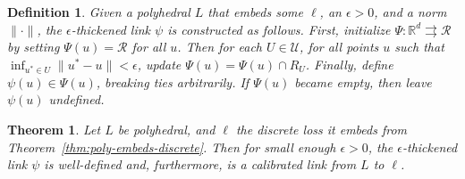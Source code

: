 \documentclass[12pt]{article}
\newcommand{\Comments}{1}
\newcommand{\mynote}[2]{\ifnum\Comments=1\textcolor{#1}{#2}\fi}
\newcommand{\mytodo}[2]{\ifnum\Comments=1%
  \todo[linecolor=#1!80!black,backgroundcolor=#1,bordercolor=#1!80!black]{#2}\fi}
\newcommand{\raf}[1]{\mynote{green}{[RF: #1]}}
\newcommand{\jessie}[1]{\mynote{purple}{[JF: #1]}}
\newcommand{\bo}[1]{\mynote{blue}{[Bo: #1]}}
\newcommand{\btw}[1]{}%
\newcommand{\reals}{\mathbb{R}}
\newcommand{\prop}[1]{\mathrm{prop}[#1]}
\newcommand{\simplex}{\Delta_\Y}
\newcommand{\R}{\mathcal{R}}
\newcommand{\U}{\mathcal{U}}
\newcommand{\Y}{\mathcal{Y}}
\newcommand{\toto}{\rightrightarrows}
\newtheorem{theorem}{Theorem}
\newtheorem{lemma}{Lemma}
\newtheorem{proposition}{Proposition}
\newtheorem{definition}{Definition}
\begin{document}

\begin{definition} \label{def:eps-thick-link}
  Given a polyhedral $L$ that embeds some $\ell$, an $\epsilon > 0$, and a norm $\|\cdot\|$, the \emph{$\epsilon$-thickened link} $\psi$ is constructed as follows.
  First, initialize $\Psi: \reals^d \toto \R$ by setting $\Psi(u) = \R$ for all $u$.
  Then for each $U \in \U$, for all points $u$ such that $\inf_{u^* \in U} \|u^*-u\| < \epsilon$, update $\Psi(u) = \Psi(u) \cap R_U$.
  Finally, define $\psi(u) \in \Psi(u)$, breaking ties arbitrarily.
  If $\Psi(u)$ became empty, then leave $\psi(u)$ undefined.
\end{definition}

\btw{JOURNAL: cool to point out that when $L$ is polyhedral, $\prop{L}$ has a finite range (this result) and so does its (multivalued map) inverse (trim result)!}


\begin{theorem}\label{thm:eps-thick-calibrated}
  Let $L$ be polyhedral, and $\ell$ the discrete loss it embeds from Theorem~\ref{thm:poly-embeds-discrete}.
  Then for small enough $\epsilon > 0$, the $\epsilon$-thickened link $\psi$ is well-defined and, furthermore, is a calibrated link from $L$ to $\ell$.
\end{theorem}
\end{document}
